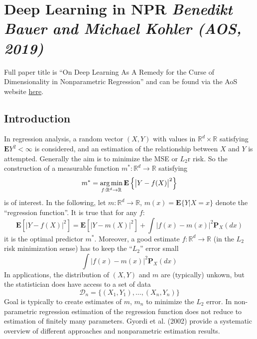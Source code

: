 
\section{Deep Learning in NPR \textit{\small Benedikt Bauer and Michael Kohler (AOS, 2019)}}
\label{sec:dl_npr}
Full paper title is ``On Deep Learning As A Remedy for the Curse of Dimensionality in Nonparametric Regression'' and can be found via the AoS website 
\href{https://projecteuclid.org/download/pdfview_1/euclid.aos/1558425645}{here}.

\subsection{Introduction}

In regression analysis, a random vector $(X,Y)$ with values in $\mathbb{R}^d \times \mathbb{R}$ satisfying $\mathbf{E}Y^2 < \infty$ is considered, and an estimation of the relationship between $X$ and $Y$ is attempted. Generally the aim is to minimize the MSE or $L_2$r risk. So the construction of a measurable function $m^*: \mathbb{R}^d \rightarrow \mathbb{R}$ satisfying 
\[m^* =\operatorname*{arg\,min}_{f: \mathbb{R}^d \rightarrow \mathbb{R}} \mathbf{E}\left\{\left|Y- f(X)\right|^2\right\}\]
is of interest. In the following, let $m:\mathbb{R}^d \rightarrow \mathbb{R}$, $m(x) = \mathbf{E}\{Y|X=x\}$ denote the ``regression function''. It is true that for any $f$:
\[\mathbf{E}\left[ \left|Y-f(X)\right|^2\right] = \mathbf{E}\left[\left|Y - m(X)\right|^2\right] + \int \left| f(x) - m(x) \right|^2 \mathbf{P}_X(dx) \]
it is the optimal predictor $m^*$. Moreover, a good estimate $f:\mathbb{R}^d \rightarrow \mathbb{R}$ (in the $L_2$ risk minimization sense) has to keep the ``$L_2$'' error small 
\[\int \left|f(x) - m(x)\right|^2 \mathbf{P}_X(dx)\]
In applications, the distribution of $(X,Y)$ and $m$ are (typically) unkown, but the statistician does have access to a set of data 
\[\mathscr{D}_n = \{(X_1,Y_1), \dots, (X_n, Y_n)\}\]
Goal is typically to create estimates of $m$, $m_n$ to minimize the $L_2$ error. In non-parametric regression estimation of the regression function does not reduce to estimation of finitely many parameters. Gyordi et al. (2002) provide a systematic overview of different approaches and nonparametric estimation results.


